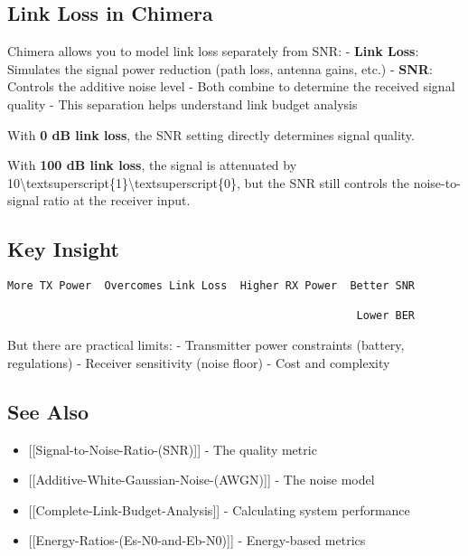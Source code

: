 \subsection{Link Loss in Chimera}\label{link-loss-in-chimera}

Chimera allows you to model link loss separately from SNR: -
\textbf{Link Loss}: Simulates the signal power reduction (path loss,
antenna gains, etc.) - \textbf{SNR}: Controls the additive noise level -
Both combine to determine the received signal quality - This separation
helps understand link budget analysis

With \textbf{0 dB link loss}, the SNR setting directly determines signal
quality.

With \textbf{100 dB link loss}, the signal is attenuated by
10\textbackslash textsuperscript\{1\}\textbackslash textsuperscript\{0\},
but the SNR still controls the noise-to-signal ratio at the receiver
input.

\subsection{Key Insight}\label{key-insight}

\begin{verbatim}
More TX Power  Overcomes Link Loss  Higher RX Power  Better SNR
                                                              
                                                      Lower BER 
\end{verbatim}

But there are practical limits: - Transmitter power constraints
(battery, regulations) - Receiver sensitivity (noise floor) - Cost and
complexity

\subsection{See Also}\label{see-also}

\begin{itemize}
\tightlist
\item
  {[}{[}Signal-to-Noise-Ratio-(SNR){]}{]} - The quality metric
\item
  {[}{[}Additive-White-Gaussian-Noise-(AWGN){]}{]} - The noise model
\item
  {[}{[}Complete-Link-Budget-Analysis{]}{]} - Calculating system
  performance
\item
  {[}{[}Energy-Ratios-(Es-N0-and-Eb-N0){]}{]} - Energy-based metrics
\end{itemize}
